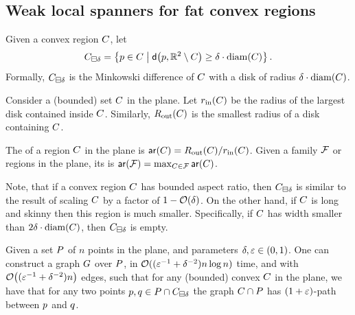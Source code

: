 \documentclass[12pt]{article}%
\begin{document}
\subsection{Weak local spanners for fat convex regions}






\begin{defn}
    Given a convex region $C$, let
    \begin{equation*}
        \shrinkDY{\body}{\delta}%
        =%
        \Set{ \pa \in \body }{ \dsY{\pa}{ \Re^2 \setminus \body} \geq \delta \cdot
           \diameterX{\body}}.
    \end{equation*}
    Formally, $C_{\boxminus \delta}$ is the Minkowski difference
    of $C$ with a disk of radius $\delta \cdot \diameterX{\body}$.
\end{defn}


\begin{defn}
    Consider a (bounded) set $C$ in the plane. Let $\rinX{\body}$
    be the radius of the largest disk contained inside $C$.
    Similarly, $\routX{\body}$ is the smallest radius of a disk
    containing $C$.

    The  of a region $C$ in the plane is
    $\arX{\body} = \routX{\body}/\rinX{\body}$. Given a family $\mathcal{F}$
    or regions in the plane, its  is
    $\arX{\FF} = \max_{\body \in \FF} \arX{\body}$.
\end{defn}

Note, that if a convex region $C$ has bounded aspect ratio, then
$C_{\boxminus \delta}$ is similar to the result of scaling $C$
by a factor of $1-\mathcal{O}(\delta)$. On the other hand, if $C$ is long
and skinny then this region is much smaller. Specifically, if $C$
has width smaller than $2 \delta \cdot \diameterX{\body}$, then
$C_{\boxminus \delta}$ is empty.


\begin{lemma}
    Given a set $P$ of $n$ points in the plane, and parameters
    $\delta, \varepsilon \in (0,1)$.  One can construct a graph $G$ over
    $P$, in $\mathcal{O}( (\varepsilon^{-1} + \delta^{-2}) n \log n)$ time, and
    with $\mathcal{O}\bigl( (\varepsilon^{-1} + \delta^{-2}) n \bigr) $ edges, such
    that for any (bounded) convex $C$ in the plane, we have that
    for any two points
    $p, q \in P \cap C_{\boxminus \delta}$ the graph
    $C  \cap {P}$ has $(1+\varepsilon)$-path between $p$ and
    $q$.
\end{lemma}
\end{document}
